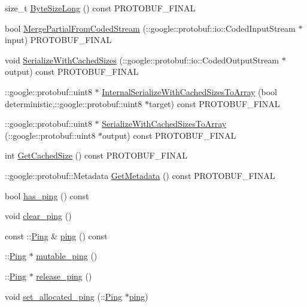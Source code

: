 \begin{DoxyCompactItemize}
\item 
size\+\_\+t \hyperlink{class_message_a6995b73c465e1d15df282625deeb52e8}{Byte\+Size\+Long} () const P\+R\+O\+T\+O\+B\+U\+F\+\_\+\+F\+I\+N\+AL
\item 
bool \hyperlink{class_message_a04b6b278c333ee73af59b1b2623e1289}{Merge\+Partial\+From\+Coded\+Stream} (\+::google\+::protobuf\+::io\+::\+Coded\+Input\+Stream $\ast$input) P\+R\+O\+T\+O\+B\+U\+F\+\_\+\+F\+I\+N\+AL
\item 
void \hyperlink{class_message_acbed042857c6b319d891b6a4053b5fbb}{Serialize\+With\+Cached\+Sizes} (\+::google\+::protobuf\+::io\+::\+Coded\+Output\+Stream $\ast$output) const P\+R\+O\+T\+O\+B\+U\+F\+\_\+\+F\+I\+N\+AL
\item 
\+::google\+::protobuf\+::uint8 $\ast$ \hyperlink{class_message_aa118b1d50aa0744b930265ad07169e0d}{Internal\+Serialize\+With\+Cached\+Sizes\+To\+Array} (bool deterministic,\+::google\+::protobuf\+::uint8 $\ast$target) const P\+R\+O\+T\+O\+B\+U\+F\+\_\+\+F\+I\+N\+AL
\item 
\+::google\+::protobuf\+::uint8 $\ast$ \hyperlink{class_message_a2f00b1061964e467f55cdec7f96fe5b0}{Serialize\+With\+Cached\+Sizes\+To\+Array} (\+::google\+::protobuf\+::uint8 $\ast$output) const P\+R\+O\+T\+O\+B\+U\+F\+\_\+\+F\+I\+N\+AL
\item 
int \hyperlink{class_message_af2aea2b07908e1cc7ab7c5987b722bfa}{Get\+Cached\+Size} () const P\+R\+O\+T\+O\+B\+U\+F\+\_\+\+F\+I\+N\+AL
\item 
\+::google\+::protobuf\+::\+Metadata \hyperlink{class_message_a1656eb682ce1b354645b8f0204d4d716}{Get\+Metadata} () const P\+R\+O\+T\+O\+B\+U\+F\+\_\+\+F\+I\+N\+AL
\item 
bool \hyperlink{class_message_a6687127e183b5c855012ff5a7137557a}{has\+\_\+ping} () const 
\item 
void \hyperlink{class_message_a67a393c3c6b9824cf07ab746fa7894d1}{clear\+\_\+ping} ()
\item 
const \+::\hyperlink{class_ping}{Ping} \& \hyperlink{class_message_ac6583c594c172467063c0e3f2b30e82a}{ping} () const 
\item 
\+::\hyperlink{class_ping}{Ping} $\ast$ \hyperlink{class_message_a06f736eaae116cd37bdaeaccf6c46135}{mutable\+\_\+ping} ()
\item 
\+::\hyperlink{class_ping}{Ping} $\ast$ \hyperlink{class_message_a604c08996b70b2bd6f16c71a6bc3060e}{release\+\_\+ping} ()
\item 
void \hyperlink{class_message_aaeb94d5348e4d13c7f5831950b19bcd3}{set\+\_\+allocated\+\_\+ping} (\+::\hyperlink{class_ping}{Ping} $\ast$\hyperlink{class_message_ac6583c594c172467063c0e3f2b30e82a}{ping})

\end{DoxyCompactItemize}
